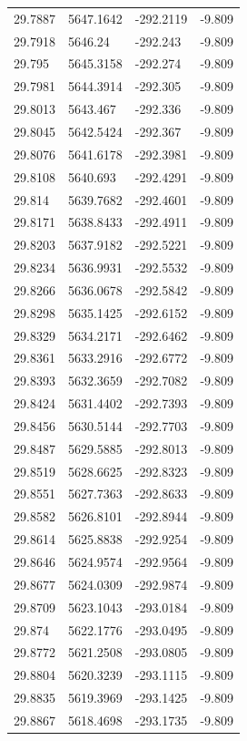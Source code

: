 \begin{table}[H]
\begin{tabular}{llll}
29.7887 & 5647.1642 & -292.2119 & -9.809 \\
29.7918 & 5646.24 & -292.243 & -9.809 \\
29.795 & 5645.3158 & -292.274 & -9.809 \\
29.7981 & 5644.3914 & -292.305 & -9.809 \\
29.8013 & 5643.467 & -292.336 & -9.809 \\
29.8045 & 5642.5424 & -292.367 & -9.809 \\
29.8076 & 5641.6178 & -292.3981 & -9.809 \\
29.8108 & 5640.693 & -292.4291 & -9.809 \\
29.814 & 5639.7682 & -292.4601 & -9.809 \\
29.8171 & 5638.8433 & -292.4911 & -9.809 \\
29.8203 & 5637.9182 & -292.5221 & -9.809 \\
29.8234 & 5636.9931 & -292.5532 & -9.809 \\
29.8266 & 5636.0678 & -292.5842 & -9.809 \\
29.8298 & 5635.1425 & -292.6152 & -9.809 \\
29.8329 & 5634.2171 & -292.6462 & -9.809 \\
29.8361 & 5633.2916 & -292.6772 & -9.809 \\
29.8393 & 5632.3659 & -292.7082 & -9.809 \\
29.8424 & 5631.4402 & -292.7393 & -9.809 \\
29.8456 & 5630.5144 & -292.7703 & -9.809 \\
29.8487 & 5629.5885 & -292.8013 & -9.809 \\
29.8519 & 5628.6625 & -292.8323 & -9.809 \\
29.8551 & 5627.7363 & -292.8633 & -9.809 \\
29.8582 & 5626.8101 & -292.8944 & -9.809 \\
29.8614 & 5625.8838 & -292.9254 & -9.809 \\
29.8646 & 5624.9574 & -292.9564 & -9.809 \\
29.8677 & 5624.0309 & -292.9874 & -9.809 \\
29.8709 & 5623.1043 & -293.0184 & -9.809 \\
29.874 & 5622.1776 & -293.0495 & -9.809 \\
29.8772 & 5621.2508 & -293.0805 & -9.809 \\
29.8804 & 5620.3239 & -293.1115 & -9.809 \\
29.8835 & 5619.3969 & -293.1425 & -9.809 \\
29.8867 & 5618.4698 & -293.1735 & -9.809 \\

\end{tabular}
\end{table}
